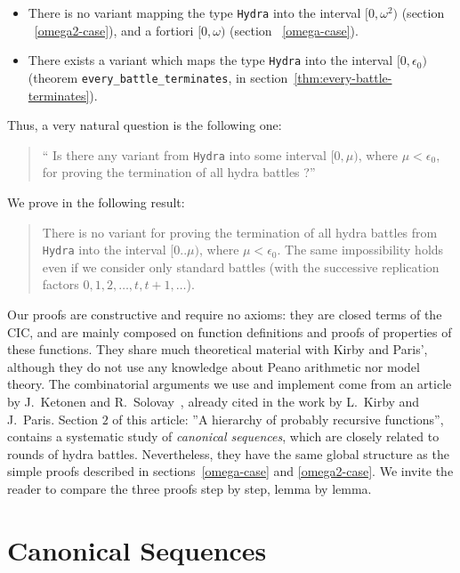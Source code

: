 \begin{itemize}
\item There is no variant mapping the type \texttt{Hydra} into the interval $[0,\omega^2)$ (section ~\vref{omega2-case}), and a fortiori 
$[0,\omega)$ (section ~\vref{omega-case}).

\item There exists a variant which maps the type \texttt{Hydra} into the
interval $[0,\epsilon_0)$ (theorem \texttt{every\_battle\_terminates}, in section~\vref{thm:every-battle-terminates}).
\end{itemize}


Thus, a very natural question is the following one:
\begin{quote}
  `` Is there  any variant from
\texttt{Hydra} into some interval $[0,\mu)$, where $\mu<\epsilon_0$, for proving the termination of all hydra battles ?''
\end{quote}

We prove in \coq{} the following result:

\begin{quote}
There is no variant for proving the termination of all hydra battles
from \texttt{Hydra} into the interval $[0..\mu)$, where
$\mu< \epsilon_0$.
The same impossibility holds even if we consider only standard battles (with the successive replication factors $0,1,2,\dots,t,t+1,\dots$).
\end{quote}

Our proofs are  constructive and require no axioms: they are  closed terms of the CIC, and are mainly composed on function definitions and proofs of properties of these functions. 
They  share much theoretical material with Kirby and Paris', although they do not use any knowledge about Peano arithmetic nor model  theory.  The combinatorial arguments we use and implement
come from 
 an article by J.~Ketonen and R.~Solovay~\cite{KS81}, already  cited in the work
 by L.~Kirby and J.~Paris.%
 Section $2$ of this article: ''A hierarchy of probably recursive functions'', contains a systematic study of \emph{canonical sequences}, which are closely related to
rounds of hydra battles. 
Nevertheless, they have the same global structure as the simple proofs described in
sections~\vref{omega-case} and \vref{omega2-case}. 
We invite the reader to compare the three proofs step by step, lemma by lemma.

\section{Canonical Sequences}
\label{ketonen-solovay-sect}

